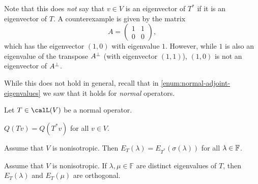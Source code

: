 \begin{remark}
    Note that this does \emph{not} say that $v \in V$ is an eigenvector of $T^*$ if it is an eigenvector of $T$. A counterexample is given by the matrix
    \begin{equation*}
        A =
        \begin{pmatrix}
            1 & 1 \\
            0 & 0
        \end{pmatrix},
    \end{equation*}
    which has the eigenvector $(1,0)$ with eigenvalue $1$. However, while $1$ is also an eigenvalue of the transpose $A^\bot$ (with eigenvector $(1,1)$), $(1,0)$ is not an eigenvector of $A^\bot$.

    While this does not hold in general, recall that in \cref{enum:normal-adjoint-eigenvalues} we saw that it holds for \emph{normal} operators.
\end{remark}


\begin{proposition}
    \label{prop:normal-operator-properties}
    Let $T \in \lin(V)$ be a normal operator.
    \begin{enumproposition}
        \item \label{enum:normal-adjoint-norm} $Q(Tv) = Q(T^*v)$ for all $v \in V$.
        
        \item \label{enum:normal-adjoint-eigenvalues} Assume that $V$ is nonisotropic. Then $E_T(\lambda) = E_{T^*}(\sigma(\lambda))$ for all $\lambda \in \mathbb{F}$.

        \item \label{enum:normal-orthogonal-eigenspaces} Assume that $V$ is nonisotropic. If $\lambda,\mu \in \mathbb{F}$ are distinct eigenvalues of $T$, then $E_T(\lambda)$ and $E_T(\mu)$ are orthogonal.
    \end{enumproposition}
\end{proposition}

